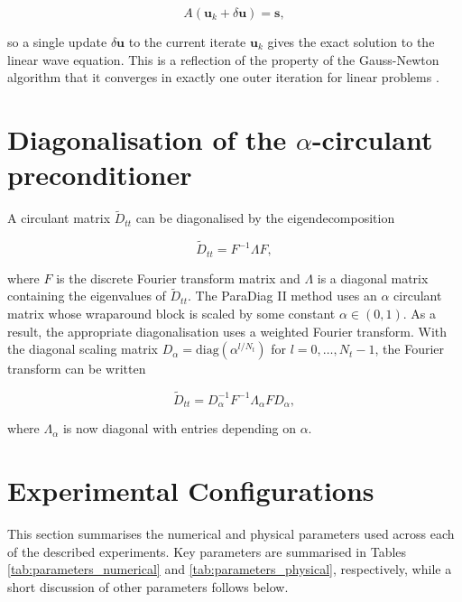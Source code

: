 \documentclass[final-report]{report-template}
\begin{document}
\begin{equation}
A(\mathbf{u}_k+\delta\mathbf{u})=\mathbf{s},
\end{equation}

so a single update $\delta \mathbf{u}$ to the current iterate $\mathbf{u}_k$ gives the exact solution to the linear wave equation. This is a reflection of the property of the Gauss-Newton algorithm that it converges in exactly one outer iteration for linear problems \cite{fletcherNewtonLikeMethods2000}.

\section{Diagonalisation of the $\alpha$-circulant preconditioner}
\label{app:precond}

A circulant matrix $\tilde{D}_{tt}$ can be diagonalised by the eigendecomposition

\begin{equation}
    \tilde{D}_{tt} = F^{-1} \Lambda F,
\end{equation}

where $F$ is the discrete Fourier transform matrix and $\Lambda$ is a diagonal matrix containing the eigenvalues of $\tilde{D}_{tt}$. The ParaDiag II method uses an $\alpha$ circulant matrix whose wraparound block is scaled by some constant $\alpha \in (0,1)$. As a result, the appropriate diagonalisation uses a weighted Fourier transform. With the diagonal scaling matrix $D_\alpha = \text{diag}(\alpha^{l/N_t})$ for $l = 0, \dots, N_t - 1$, the Fourier transform can be written

\begin{equation}
    \tilde{D}_{tt} = D_\alpha^{-1} F^{-1} \Lambda_\alpha F D_\alpha,
\end{equation}

where $\Lambda_\alpha$ is now diagonal with entries depending on $\alpha$.

\section{Experimental Configurations}
\label{app:setup}
This section summarises the numerical and physical parameters used across each of the described experiments. Key parameters are summarised in Tables \ref{tab:parameters_numerical} and \ref{tab:parameters_physical}, respectively, while a short discussion of other parameters follows below.
\end{document}
